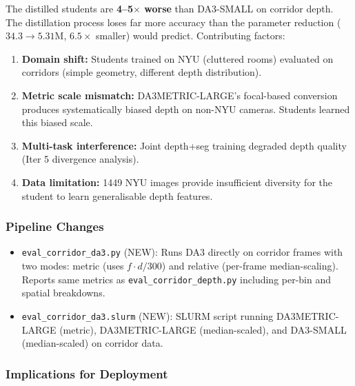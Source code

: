 \documentclass[11pt,a4paper]{article}
\begin{document}
The distilled students are \textbf{4--5$\times$ worse} than DA3-SMALL
on corridor depth. The distillation process loses far more accuracy
than the parameter reduction ($34.3 \to 5.31$M, $6.5\times$ smaller)
would predict. Contributing factors:
\begin{enumerate}[nosep]
  \item \textbf{Domain shift:} Students trained on NYU (cluttered rooms)
    evaluated on corridors (simple geometry, different depth distribution).
  \item \textbf{Metric scale mismatch:} DA3METRIC-LARGE's focal-based
    conversion produces systematically biased depth on non-NYU cameras.
    Students learned this biased scale.
  \item \textbf{Multi-task interference:} Joint depth+seg training
    degraded depth quality (Iter 5 divergence analysis).
  \item \textbf{Data limitation:} 1449 NYU images provide insufficient
    diversity for the student to learn generalisable depth features.
\end{enumerate}

\subsubsection{Pipeline Changes}

\begin{itemize}[nosep]
  \item \texttt{eval\_corridor\_da3.py} (NEW): Runs DA3 directly on
    corridor frames with two modes: metric (uses $f \cdot d / 300$) and
    relative (per-frame median-scaling). Reports same metrics as
    \texttt{eval\_corridor\_depth.py} including per-bin and spatial
    breakdowns.
  \item \texttt{eval\_corridor\_da3.slurm} (NEW): SLURM script running
    DA3METRIC-LARGE (metric), DA3METRIC-LARGE (median-scaled), and
    DA3-SMALL (median-scaled) on corridor data.
\end{itemize}

\subsubsection{Implications for Deployment}
\end{document}
